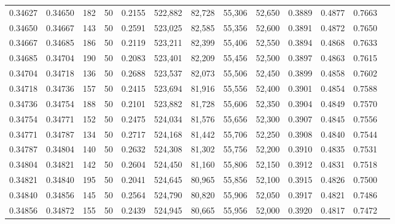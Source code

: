\begin{tabular}{rrrrrrrrrrrrr}
0.34627 & 0.34650 &   182 &  50 &                                     0.2155 & 522,882 &  82,728 &  55,306 &  52,650 & 0.3889 & 0.4877 & 0.7663 \\
0.34650 & 0.34667 &   143 &  50 &                                     0.2591 & 523,025 &  82,585 &  55,356 &  52,600 & 0.3891 & 0.4872 & 0.7650 \\
0.34667 & 0.34685 &   186 &  50 &                                     0.2119 & 523,211 &  82,399 &  55,406 &  52,550 & 0.3894 & 0.4868 & 0.7633 \\
0.34685 & 0.34704 &   190 &  50 &                                     0.2083 & 523,401 &  82,209 &  55,456 &  52,500 & 0.3897 & 0.4863 & 0.7615 \\
0.34704 & 0.34718 &   136 &  50 &                                     0.2688 & 523,537 &  82,073 &  55,506 &  52,450 & 0.3899 & 0.4858 & 0.7602 \\
0.34718 & 0.34736 &   157 &  50 &                                     0.2415 & 523,694 &  81,916 &  55,556 &  52,400 & 0.3901 & 0.4854 & 0.7588 \\
0.34736 & 0.34754 &   188 &  50 &                                     0.2101 & 523,882 &  81,728 &  55,606 &  52,350 & 0.3904 & 0.4849 & 0.7570 \\
0.34754 & 0.34771 &   152 &  50 &                                     0.2475 & 524,034 &  81,576 &  55,656 &  52,300 & 0.3907 & 0.4845 & 0.7556 \\
0.34771 & 0.34787 &   134 &  50 &                                     0.2717 & 524,168 &  81,442 &  55,706 &  52,250 & 0.3908 & 0.4840 & 0.7544 \\
0.34787 & 0.34804 &   140 &  50 &                                     0.2632 & 524,308 &  81,302 &  55,756 &  52,200 & 0.3910 & 0.4835 & 0.7531 \\
0.34804 & 0.34821 &   142 &  50 &                                     0.2604 & 524,450 &  81,160 &  55,806 &  52,150 & 0.3912 & 0.4831 & 0.7518 \\
0.34821 & 0.34840 &   195 &  50 &                                     0.2041 & 524,645 &  80,965 &  55,856 &  52,100 & 0.3915 & 0.4826 & 0.7500 \\
0.34840 & 0.34856 &   145 &  50 &                                     0.2564 & 524,790 &  80,820 &  55,906 &  52,050 & 0.3917 & 0.4821 & 0.7486 \\
0.34856 & 0.34872 &   155 &  50 &                                     0.2439 & 524,945 &  80,665 &  55,956 &  52,000 & 0.3920 & 0.4817 & 0.7472 \\

\end{tabular}
